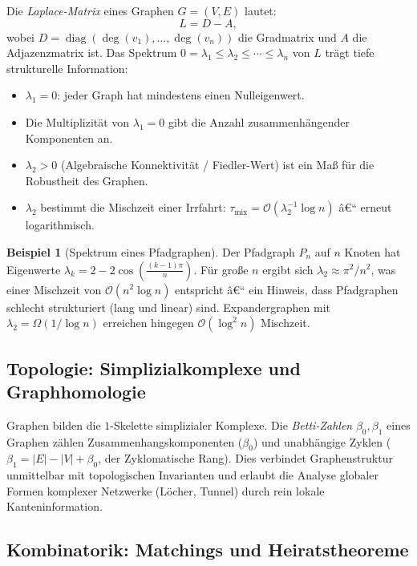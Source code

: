 ﻿\documentclass[12pt,a4paper,twoside]{article}
\theoremstyle{definition}
\newtheorem{beispiel}{Beispiel}[section]
\theoremstyle{plain}
\theoremstyle{remark}
\begin{document}
Die \emph{Laplace-Matrix} eines Graphen $G=(V,E)$ lautet:
\[
  L = D - A,
\]
wobei $D = \operatorname{diag}(\deg(v_1), \ldots, \deg(v_n))$
die Gradmatrix und $A$ die Adjazenzmatrix ist.  Das
Spektrum $0 = \lambda_1 \leq \lambda_2 \leq \cdots \leq \lambda_n$
von $L$ trägt tiefe strukturelle Information:

\begin{itemize}
  \item $\lambda_1 = 0$: jeder Graph hat mindestens einen Nulleigenwert.
  \item Die Multiplizität von $\lambda_1 = 0$ gibt die Anzahl
        zusammenhängender Komponenten an.
  \item $\lambda_2 > 0$ (Algebraische Konnektivität / Fiedler-Wert)
        ist ein Maß für die Robustheit des Graphen.
  \item $\lambda_2$ bestimmt die Mischzeit einer Irrfahrt:
        $\tau_{\text{mix}} = \mathcal{O}(\lambda_2^{-1} \log n)$ â€“
        erneut logarithmisch.
\end{itemize}

\begin{beispiel}[Spektrum eines Pfadgraphen]
Der Pfadgraph $P_n$ auf $n$ Knoten hat Eigenwerte
$\lambda_k = 2 - 2\cos\!\left(\tfrac{(k-1)\pi}{n}\right)$.
Für große $n$ ergibt sich $\lambda_2 \approx \pi^2/n^2$,
was einer Mischzeit von $\mathcal{O}(n^2 \log n)$ entspricht â€“
ein Hinweis, dass Pfadgraphen schlecht strukturiert (lang und
linear) sind.  Expandergraphen mit $\lambda_2 = \Omega(1/\log n)$
erreichen hingegen $\mathcal{O}(\log^2 n)$ Mischzeit.
\end{beispiel}

\subsection{Topologie: Simplizialkomplexe und Graphhomologie}

Graphen bilden die $1$-Skelette simplizialer Komplexe.  Die
\emph{Betti-Zahlen} $\beta_0, \beta_1$ eines Graphen zählen
Zusammenhangskomponenten ($\beta_0$) und unabhängige Zyklen
($\beta_1 = |E| - |V| + \beta_0$, der Zyklomatische Rang).
Dies verbindet Graphenstruktur unmittelbar mit topologischen
Invarianten und erlaubt die Analyse globaler Formen komplexer
Netzwerke (Löcher, Tunnel) durch rein lokale Kanteninformation.

\subsection{Kombinatorik: Matchings und Heiratstheoreme}
\end{document}
